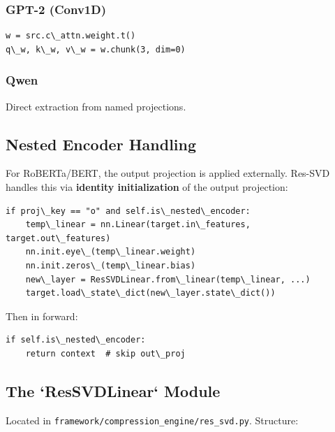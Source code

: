\subsubsection{GPT-2 (Conv1D)}

\begin{lstlisting}
w = src.c\_attn.weight.t()
q\_w, k\_w, v\_w = w.chunk(3, dim=0)
\end{lstlisting}

\subsubsection{Qwen}

Direct extraction from named projections.

\subsection{Nested Encoder Handling}

For RoBERTa/BERT, the output projection is applied externally. 
Res-SVD handles this via \textbf{identity initialization} of the output projection:

\begin{lstlisting}
if proj\_key == "o" and self.is\_nested\_encoder:
    temp\_linear = nn.Linear(target.in\_features, target.out\_features)
    nn.init.eye\_(temp\_linear.weight)
    nn.init.zeros\_(temp\_linear.bias)
    new\_layer = ResSVDLinear.from\_linear(temp\_linear, ...)
    target.load\_state\_dict(new\_layer.state\_dict())
\end{lstlisting}

Then in forward:
\begin{lstlisting}
if self.is\_nested\_encoder:
    return context  # skip out\_proj
\end{lstlisting}

\subsection{The `ResSVDLinear` Module}

Located in \texttt{framework/compression\_engine/res\_svd.py}. Structure:

